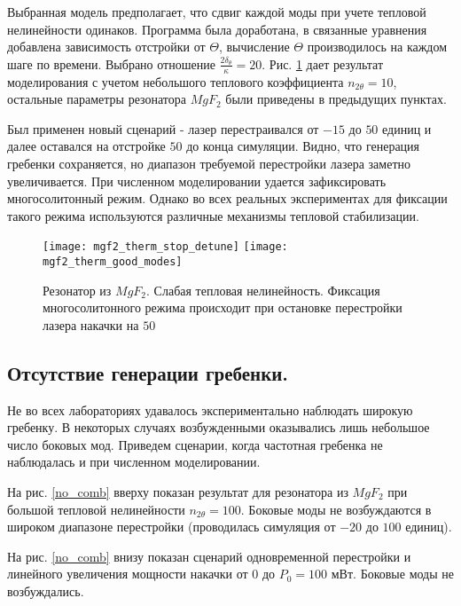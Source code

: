 Выбранная модель предполагает, что сдвиг каждой моды при учете тепловой нелинейности одинаков. Программа была доработана, в связанные уравнения добавлена зависимость отстройки от $\Theta$, вычисление $\Theta$ производилось на каждом шаге по времени. Выбрано отношение $\frac{2\delta_\theta}{\kappa}=20$.  Рис. \ref{therm} дает результат моделирования с учетом небольшого теплового коэффициента $n_{2\theta}=10$, остальные параметры резонатора $MgF_2$ были приведены в предыдущих пунктах.

Был применен новый сценарий - лазер перестраивался от $-15$ до $50$ единиц и далее оставался на отстройке $50$ до конца симуляции. Видно, что генерация гребенки сохраняется, но диапазон требуемой перестройки лазера заметно увеличивается. При численном моделировании удается зафиксировать многосолитонный режим. Однако во всех реальных экспериментах для фиксации такого режима используются различные механизмы тепловой стабилизации.

\begin{figure}
  \texttt{[image: mgf2\_therm\_stop\_detune]}
  \texttt{[image: mgf2\_therm\_good\_modes]}
  \caption{Резонатор из $MgF_2$. Слабая тепловая нелинейность. Фиксация многосолитонного режима происходит при остановке перестройки лазера накачки на $50$} \label{therm}
\end{figure}

\subsection{Отсутствие генерации гребенки.}
Не во всех лабораториях удавалось экспериментально наблюдать широкую гребенку. В некоторых случаях возбужденными оказывались лишь небольшое число боковых мод. Приведем сценарии, когда частотная гребенка не наблюдалась и при численном моделировании.

На рис. \ref{no_comb} вверху показан результат для резонатора из $MgF_2$ при большой тепловой нелинейности $n_{2\theta}=100$. Боковые моды не возбуждаются в широком диапазоне перестройки (проводилась симуляция от $-20$ до $100$ единиц).

На рис. \ref{no_comb} внизу показан сценарий одновременной перестройки и линейного увеличения мощности накачки от 0 до $P_0=100$ мВт. Боковые моды не возбуждались.

